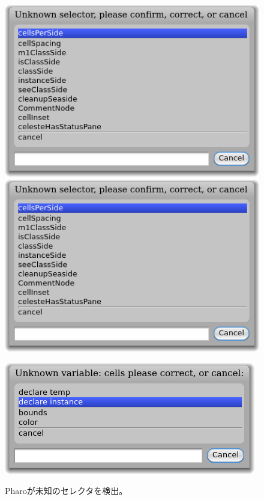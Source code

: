 \documentclass[a4paper,10pt,twoside]{book}
\begin{document}
\begin{figure}[htb]
\begin{minipage}{0.48\textwidth}
	\centering
	\ifluluelse
		{\includegraphics[width=\textwidth]{UnknownSelector}}
		{\includegraphics[scale=0.7]{UnknownSelector}}
	\caption{Pharoが未知のセレクタを検出。}
\end{minipage}
\hfill
\begin{minipage}{0.48\textwidth}
	\centering
	\ifluluelse
		{\includegraphics[width=\textwidth]{DeclareInstanceVar}}

\end{minipage}
\end{figure}
\end{document}
